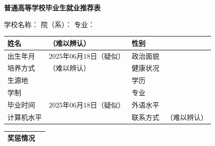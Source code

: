 \documentclass[UTF8,10pt,a4paper,fontset=fandol]{ctexart}
\newcommand{\fieldvalue}[1]{#1}
\newcommand{\handwritten}[1]{#1}
\begin{document}

\begin{center}
{\Large\textbf{普通高等学校毕业生就业推荐表}}
\end{center}

\begin{center}
\small
学校名称：\underline{\hspace{7em}}
\qquad
院（系）：\underline{\hspace{7em}}
\qquad
专业：\underline{\hspace{7em}}
\end{center}

\vspace{0.4em}

\begin{tabularx}{\textwidth}{|p{3.5em}|X|p{4.5em}|X|}
\hline
姓名 & 
\fieldvalue{\handwritten{（难以辨认）}} &
性别 & \rule{0pt}{1.8em} \\ \hline
出生年月 &
\fieldvalue{\handwritten{2025年06月18日（疑似）}} &
政治面貌 & \\ \hline
培养方式 & 
\fieldvalue{\handwritten{（难以辨认）}} &
健康状况 & \\ \hline
生源地 & & 学历 & \\ \hline
学制 & & 专业 & \\ \hline
毕业时间 &
\fieldvalue{\handwritten{2025年06月18日（疑似）}} &
外语水平 & \\ \hline
计算机水平 & & 联系方式 &
\fieldvalue{\handwritten{（难以辨认）}} \\ \hline
\end{tabularx}

\vspace{0.5em}

\begin{tabularx}{\textwidth}{|p{7em}|X|}
\hline
奖惩情况 &
\rule{0pt}{3.2em} \\ \hline
\end{tabularx}
\end{document}
